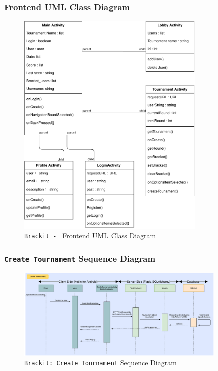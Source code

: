 \documentclass{article}
\begin{document}
\subsubsection{Frontend UML Class Diagram}
\begin{center}
    \begin{figure}[htp]
        \centering
        \includegraphics[width=9cm]{../diagrams/brackit-frontend-classDiagram.pdf}
        \caption{\texttt{Brackit - } Frontend UML Class Diagram}
        \end{figure}
\end{center}
\subsubsection{\texttt{Create Tournament} Sequence Diagram}
\begin{center}
    \begin{figure}[htp]
        \centering
        \includegraphics[width=10cm]{../diagrams/sequence.pdf}
        \caption{\texttt{Brackit: Create Tournament} Sequence Diagram}
        \end{figure}
\end{center}
\end{document}
